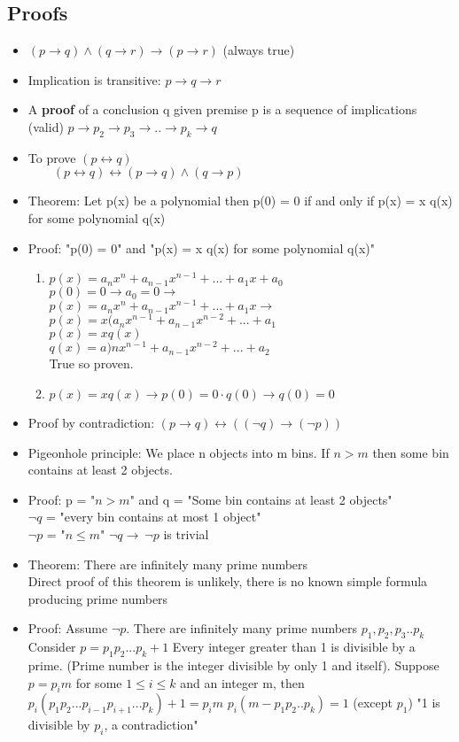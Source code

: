 \documentclass[9pt, letterpaper, oneside]{article}
\begin{document}
\subsection{Proofs}
\begin{itemize}
	\item $(p \to q) \wedge (q \to r) \to (p \to r)$ (always true)
	\item Implication is transitive: $p \to q \to r$
	\item A \textbf{proof} of a conclusion q given premise p is a sequence of implications (valid) $p \to p_2 \to p_3 \to .. \to p_k \to q$
	\item To prove $(p \leftrightarrow q)$ \\
		$\qquad (p \leftrightarrow q) \leftrightarrow (p \to q) \wedge (q \to p)$
	\item Theorem: Let p(x) be a polynomial then p(0) = 0 if and only if p(x) = x q(x) for some polynomial q(x)
	\item Proof: "p(0) = 0" and "p(x) = x q(x) for some polynomial q(x)"
	\begin{enumerate}
		\item $p(x) = a_nx^n + a_{n -1}x^{n-1} + ... + a_1x + a_0$ \\
			$p(0) = 0 \to a_0 = 0 \to$ \\
			$p(x) = a_nx^n + a_{n -1}x^{n-1} + ... + a_1x \to$ \\
			$p(x) = x(a_nx^{n-1} + a_{n -1}x^{n-2} + ... + a_1$ \\
			$p(x) = xq(x)$ \\
			$q(x) = a)nx^{n-1} + a_{n-1}x^{n-2} + ... + a_2$ \\
			True so proven.
		\item $p(x) = x q(x) \to p(0) = 0 \cdot q(0) \to q(0) = 0$
	\end{enumerate}
	\item Proof by contradiction: $(p \to q) \leftrightarrow ((\neg q)\to (\neg p))$
	\item Pigeonhole principle: We place n objects into m bins. If $n > m$ then some bin contains at least 2 objects.
	\item Proof: p = "$n > m$" and q = "Some bin contains at least 2 objects" \\
	$\neg q$ = "every bin contains at most 1 object" \\
	$\neg p$ = "$n \leq m$"
	$\neg q \to\ \neg p$ is trivial
	\item Theorem: There are infinitely many prime numbers \\
		Direct proof of this theorem is unlikely, there is no known simple formula producing prime numbers
	\item Proof: Assume $\neg p$. There are infinitely many prime numbers $p_1, p_2, p_3 .. p_k$ \\
	Consider $p = p_1p_2...p_k + 1$
	Every integer greater than 1 is divisible by a prime. (Prime number is the integer divisible by only 1 and itself).
	Suppose $p = p_im$ for some $1 \leq i \leq k$ and an integer m, then $p_i(p_1p_2...p_{i-1}p_{i+1}...p_k) + 1 = p_im$
	$p_i(m - p_1p_2..p_k) = 1$ (except $p_1$)
	"1 is divisible by $p_i$, a contradiction"
\end{itemize}
\end{document}
